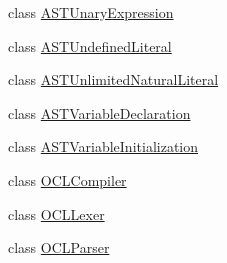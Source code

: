 \begin{DoxyCompactItemize}
\item 
class \hyperlink{classorg_1_1tzi_1_1use_1_1parser_1_1ocl_1_1_a_s_t_unary_expression}{A\-S\-T\-Unary\-Expression}
\item 
class \hyperlink{classorg_1_1tzi_1_1use_1_1parser_1_1ocl_1_1_a_s_t_undefined_literal}{A\-S\-T\-Undefined\-Literal}
\item 
class \hyperlink{classorg_1_1tzi_1_1use_1_1parser_1_1ocl_1_1_a_s_t_unlimited_natural_literal}{A\-S\-T\-Unlimited\-Natural\-Literal}
\item 
class \hyperlink{classorg_1_1tzi_1_1use_1_1parser_1_1ocl_1_1_a_s_t_variable_declaration}{A\-S\-T\-Variable\-Declaration}
\item 
class \hyperlink{classorg_1_1tzi_1_1use_1_1parser_1_1ocl_1_1_a_s_t_variable_initialization}{A\-S\-T\-Variable\-Initialization}
\item 
class \hyperlink{classorg_1_1tzi_1_1use_1_1parser_1_1ocl_1_1_o_c_l_compiler}{O\-C\-L\-Compiler}
\item 
class \hyperlink{classorg_1_1tzi_1_1use_1_1parser_1_1ocl_1_1_o_c_l_lexer}{O\-C\-L\-Lexer}
\item 
class \hyperlink{classorg_1_1tzi_1_1use_1_1parser_1_1ocl_1_1_o_c_l_parser}{O\-C\-L\-Parser}
\end{DoxyCompactItemize}
